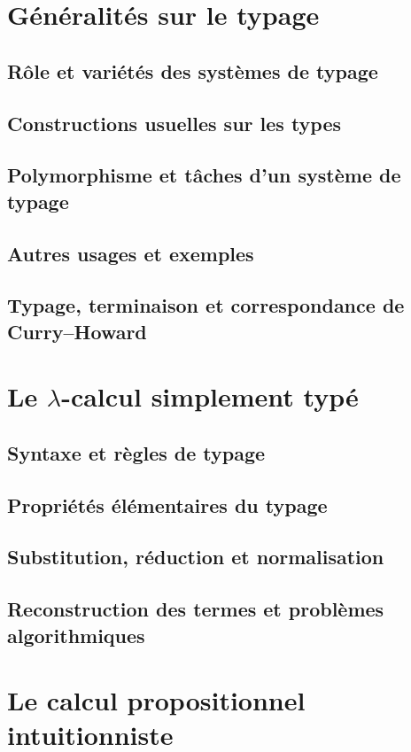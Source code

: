 \section{Généralités sur le typage}
\subsection{Rôle et variétés des systèmes de typage}
\subsection{Constructions usuelles sur les types}
\subsection{Polymorphisme et tâches d'un système de typage}
\subsection{Autres usages et exemples}
\subsection{Typage, terminaison et correspondance de Curry--Howard}

\section{Le \texorpdfstring{$\lambda$}{lambda}-calcul simplement typé}
\subsection{Syntaxe et règles de typage}
\subsection{Propriétés élémentaires du typage}
\subsection{Substitution, réduction et normalisation}
\subsection{Reconstruction des termes et problèmes algorithmiques}

\section{Le calcul propositionnel intuitionniste}
